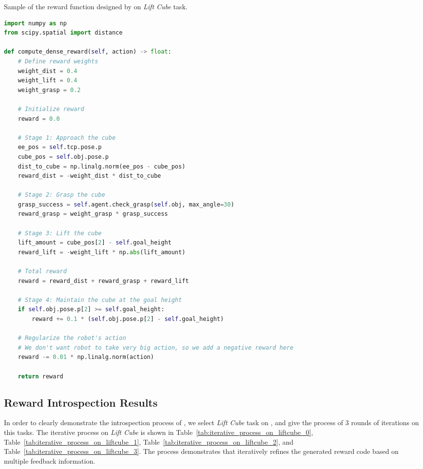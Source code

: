 \documentclass{article}
\theoremstyle{plain}
\theoremstyle{definition}
\theoremstyle{remark}
\begin{document}
\begin{table}[!ht]
\centering
\caption{Sample of the reward function designed by \tr on \MS \textit{Lift Cube} task.}
\begin{tcolorbox}
\begin{lstlisting}[language=python,breaklines]
import numpy as np
from scipy.spatial import distance

def compute_dense_reward(self, action) -> float:
    # Define reward weights
    weight_dist = 0.4
    weight_lift = 0.4
    weight_grasp = 0.2

    # Initialize reward
    reward = 0.0

    # Stage 1: Approach the cube
    ee_pos = self.tcp.pose.p
    cube_pos = self.obj.pose.p
    dist_to_cube = np.linalg.norm(ee_pos - cube_pos)
    reward_dist = -weight_dist * dist_to_cube
    
    # Stage 2: Grasp the cube
    grasp_success = self.agent.check_grasp(self.obj, max_angle=30)
    reward_grasp = weight_grasp * grasp_success

    # Stage 3: Lift the cube
    lift_amount = cube_pos[2] - self.goal_height
    reward_lift = -weight_lift * np.abs(lift_amount)

    # Total reward
    reward = reward_dist + reward_grasp + reward_lift

    # Stage 4: Maintain the cube at the goal height
    if self.obj.pose.p[2] >= self.goal_height:
        reward += 0.1 * (self.obj.pose.p[2] - self.goal_height)
        
    # Regularize the robot's action
    # We don't want robot to take very big action, so we add a negative reward here
    reward -= 0.01 * np.linalg.norm(action)

    return reward
\end{lstlisting}
\end{tcolorbox}
\label{tab:text2reward_code_liftcube}
\end{table}


\subsection{Reward Introspection Results}
In order to clearly demonstrate the introspection process of \ourmethod, we select \textit{Lift Cube} task on \MS, and give the process of $3$ rounds of iterations on this tasks. The iterative process on \textit{Lift Cube} is shown in Table~\ref{tab:iterative_process_on_liftcube_0}, Table~\ref{tab:iterative_process_on_liftcube_1}, Table~\ref{tab:iterative_process_on_liftcube_2}, and Table~\ref{tab:iterative_process_on_liftcube_3}. The process demonstrates that \ourmethod iteratively refines the generated reward code based on multiple feedback information.
\end{document}

